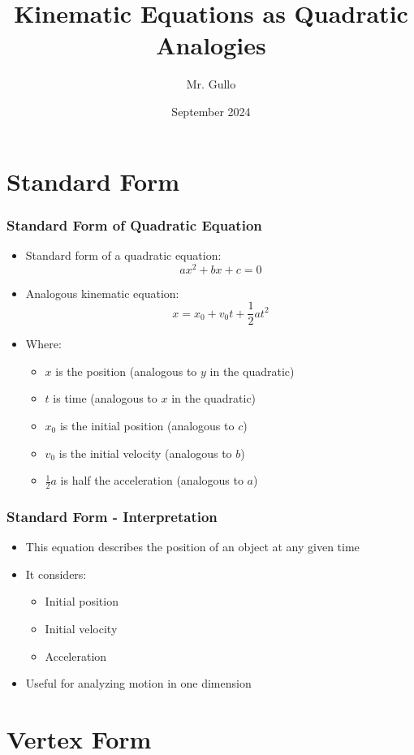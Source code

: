 \documentclass{beamer}
\title[Kinematic Equations]{Kinematic Equations as Quadratic Analogies}
\subtitle{ }
\author[Mr. Gullo]{Mr. Gullo}
\date[Sept 2024]{September 2024}
\begin{document}
\frame{\titlepage}
\section{Standard Form}

\begin{frame}
\frametitle{Standard Form of Quadratic Equation}
\begin{itemize}
    \item Standard form of a quadratic equation:
    $$ax^2 + bx + c = 0$$
    \item Analogous kinematic equation:
    $$x = x_0 + v_0t + \frac{1}{2}at^2$$
    \item Where:
    \begin{itemize}
        \item $x$ is the position (analogous to $y$ in the quadratic)
        \item $t$ is time (analogous to $x$ in the quadratic)
        \item $x_0$ is the initial position (analogous to $c$)
        \item $v_0$ is the initial velocity (analogous to $b$)
        \item $\frac{1}{2}a$ is half the acceleration (analogous to $a$)
    \end{itemize}
\end{itemize}
\end{frame}

\begin{frame}
\frametitle{Standard Form - Interpretation}
\begin{itemize}
    \item This equation describes the position of an object at any given time
    \item It considers:
    \begin{itemize}
        \item Initial position
        \item Initial velocity
        \item Acceleration
    \end{itemize}
    \item Useful for analyzing motion in one dimension
\end{itemize}
\end{frame}

\section{Vertex Form}
\end{document}
